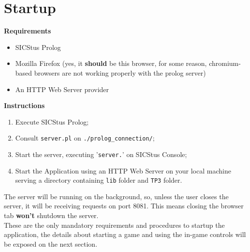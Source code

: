 \section{Startup}

\textbf{Requirements}
\begin{itemize}
    \item SICStus Prolog
    \item Mozilla Firefox (yes, it \textbf{should} be this browser, for some reason, chromium-based browsers are not working properly with the prolog server)
    \item An HTTP Web Server provider
\end{itemize}

\noindent \textbf{Instructions}
\begin{enumerate}
    \item Execute SICStus Prolog;
    \item Consult \verb+server.pl+ on \verb+./prolog_connection/+;
    \item Start the server, executing '\verb+server.+' on SICStus Console;
    \item Start the Application using an HTTP Web Server on your local machine serving a directory containing \verb+lib+ folder and \verb+TP3+ folder.
\end{enumerate}

\noindent The server will be running on the background, so, unless the user closes the server, it will be receiving 
requests on port 8081.
This means closing the browser tab \textbf{won't} shutdown the server.\\
\noindent These are the only mandatory requirements and procedures to startup the application, the details about starting a game and using the in-game controls
will be exposed on the next section.
